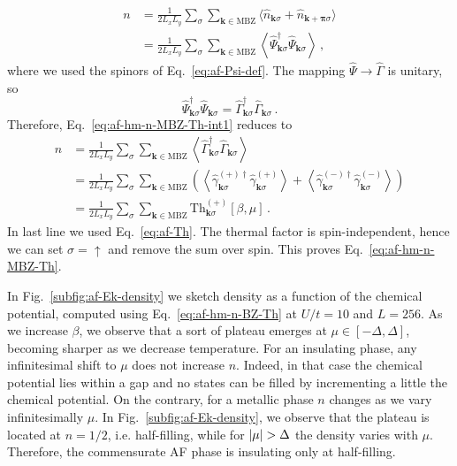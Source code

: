 \begin{tabproof}
	\begin{align}
		n &= \frac{1}{2L_x L_y} \sum_\sigma \sum_{\mathbf{k} \in \mathrm{MBZ}} \langle 
		\hat n_{\mathbf{k}\sigma} + \hat n_{\mathbf{k}+\bm{\pi}\sigma}
		\rangle \nonumber \\
		&= \frac{1}{2L_x L_y} \sum_\sigma \sum_{\mathbf{k} \in \mathrm{MBZ}} \left\langle 
		\hat \Psi_{\mathbf{k}\sigma}^\dagger \hat \Psi_{\mathbf{k}\sigma} 
		\right\rangle \, , \label{eq:af-hm-n-MBZ-Th-int1}
	\end{align}
	where we used the spinors of Eq.~\eqref{eq:af-Psi-def}. The mapping $\hat \Psi \to \hat \Gamma$ is unitary, so 
	\[
	\hat \Psi_{\mathbf{k}\sigma}^\dagger \hat \Psi_{\mathbf{k}\sigma} = \hat \Gamma_{\mathbf{k}\sigma}^\dagger \hat \Gamma_{\mathbf{k}\sigma} \, .
	\]
	Therefore, Eq.~\eqref{eq:af-hm-n-MBZ-Th-int1} reduces to
	\[
	\begin{aligned}
		n &= \frac{1}{2L_x L_y} \sum_\sigma \sum_{\mathbf{k} \in \mathrm{MBZ}} \left\langle 
		\hat \Gamma_{\mathbf{k}\sigma}^\dagger \hat \Gamma_{\mathbf{k}\sigma} 
		\right\rangle \\
		&= \frac{1}{2L_x L_y} \sum_\sigma \sum_{\mathbf{k} \in \mathrm{MBZ}} \left(
		\left\langle \hat \gamma_{\mathbf{k}\sigma}^{(+)\dagger} \hat \gamma_{\mathbf{k}\sigma}^{(+)} \right\rangle + 
		\left\langle \hat \gamma_{\mathbf{k}\sigma}^{(-)\dagger} \hat \gamma_{\mathbf{k}\sigma}^{(-)} \right\rangle
		\right) \\
		&= \frac{1}{2L_x L_y} \sum_\sigma \sum_{\mathbf{k} \in \mathrm{MBZ}} \mathrm{Th}_{\mathbf{k}\sigma}^{(+)}[\beta,\mu] \, .
	\end{aligned}
	\]
	In last line we used
	Eq.~\eqref{eq:af-Th}. The thermal factor is spin-independent, hence we can set $\sigma=\uparrow$ and remove the sum over spin. This proves Eq.~\eqref{eq:af-hm-n-MBZ-Th}.
\end{tabproof}

In Fig.~\ref{subfig:af-Ek-density} we sketch density as a function of the chemical potential, computed using Eq.~\eqref{eq:af-hm-n-BZ-Th} at $U/t=10$ and $L=256$. As we increase $\beta$, we observe that a sort of plateau emerges at $\mu \in [-\Delta,\Delta]$, becoming sharper as we decrease temperature. For an insulating phase, any infinitesimal shift to $\mu$ does not increase $n$. Indeed, in that case the chemical potential lies within a gap and no states can be filled by incrementing a little the chemical potential. On the contrary, for a metallic phase $n$ changes as we vary infinitesimally $\mu$. In Fig.~\ref{subfig:af-Ek-density}, we observe that the plateau is located at $n=1/2$, i.e. half-filling, while for $\abs{\mu} > \Delta$ the density varies with $\mu$. Therefore, the commensurate AF phase is insulating only at half-filling.

